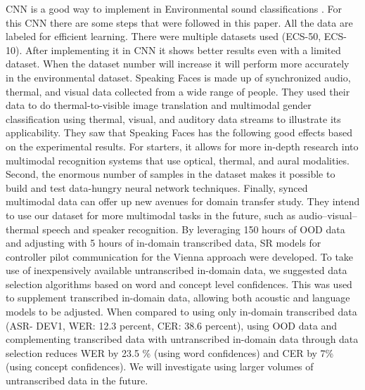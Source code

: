 CNN is a good way to implement in Environmental sound classifications \parencite{12}. For this CNN there are some steps that were followed in this paper. All the data are labeled for efficient learning. There were multiple datasets used (ECS-50, ECS-10). After implementing it in CNN it shows better results even with a limited dataset. When the dataset number will increase it will perform more accurately in the environmental dataset. Speaking Faces is made up of synchronized audio, thermal, and visual data collected from a wide range of people. They used their data to do thermal-to-visible image translation and multimodal gender classification using thermal, visual, and auditory data streams to illustrate its applicability. They saw that Speaking Faces has the following good effects based on the experimental results. For starters, it allows for more in-depth research into multimodal recognition systems that use optical, thermal, and aural modalities. Second, the enormous number of samples in the dataset makes it possible to build and test data-hungry neural network techniques. Finally, synced multimodal data can offer up new avenues for domain transfer study. They intend to use our dataset for more multimodal tasks in the future, such as audio–visual–thermal speech and speaker recognition. By leveraging 150 hours of OOD data and adjusting with 5 hours of in-domain transcribed data, SR models for controller pilot communication for the Vienna approach were developed. To take use of inexpensively available untranscribed in-domain data, we suggested data selection algorithms based on word and concept level confidences. This was used to supplement transcribed in-domain data, allowing both acoustic and language models to be adjusted. When compared to using only in-domain transcribed data (ASR- DEV1, WER: 12.3 percent, CER: 38.6 percent), using OOD data and complementing transcribed data with untranscribed in-domain data through data selection reduces WER by 23.5 \% (using word confidences) and CER by 7\% (using concept confidences). We will investigate using larger volumes of untranscribed data in the future. 


